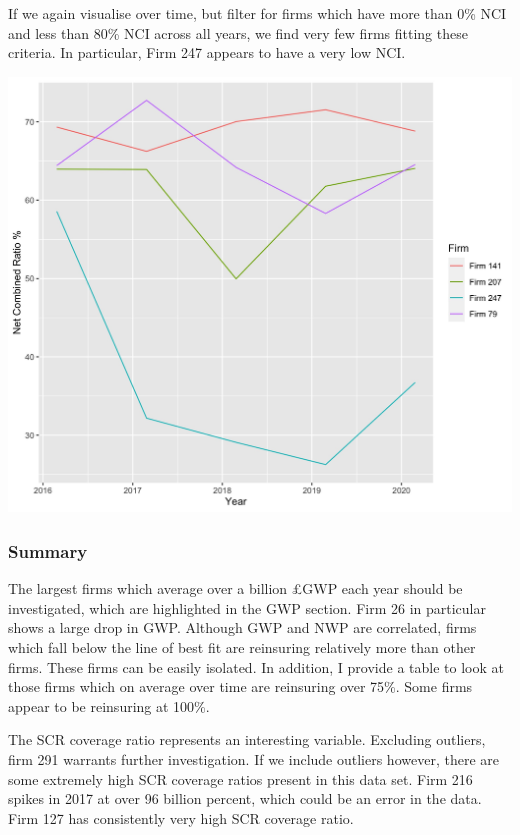 \documentclass[
]{article}
\begin{document}
If we again visualise over time, but filter for firms which have more
than 0\% NCI and less than 80\% NCI across all years, we find very few
firms fitting these criteria. In particular, Firm 247 appears to have a
very low NCI.

\includegraphics[width=1\linewidth]{../figs/net_combined_ratio_minus_outliers_plot}

\hypertarget{summary}{%
\subsubsection{Summary}\label{summary}}

The largest firms which average over a billion £GWP each year should be
investigated, which are highlighted in the GWP section. Firm 26 in
particular shows a large drop in GWP. Although GWP and NWP are
correlated, firms which fall below the line of best fit are reinsuring
relatively more than other firms. These firms can be easily isolated. In
addition, I provide a table to look at those firms which on average over
time are reinsuring over 75\%. Some firms appear to be reinsuring at
100\%.

The SCR coverage ratio represents an interesting variable. Excluding
outliers, firm 291 warrants further investigation. If we include
outliers however, there are some extremely high SCR coverage ratios
present in this data set. Firm 216 spikes in 2017 at over 96 billion
percent, which could be an error in the data. Firm 127 has consistently
very high SCR coverage ratio.
\end{document}
